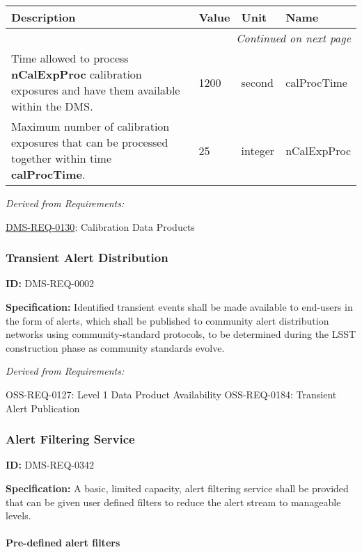 \documentclass[SE,toc,lsstdraft]{lsstdoc}
\makeatletter
\newcommand{\paramname}[1]{\hspace{0pt}#1}
\newcommand{\unitname}[1]{\hspace{0pt}#1}
\newenvironment{parameters}[0]{%
\setlength\LTleft{0pt}
\setlength\LTright{\fill}
\begin{small}
\begin{longtable}[]{|p{0.5\textwidth}|l|p{0.6in}|p{1.74in}@{}|}

\hline \textbf{Description} & \textbf{Value} & \textbf{Unit} & \textbf{Name} \\ \hline
\endhead

\hline \multicolumn{4}{r}{\emph{Continued on next page}} \\
\endfoot

\hline\hline
\endlastfoot
}{%
\hline
\end{longtable}
\end{small}
}
\makeatother
\begin{document}
\begin{parameters}
Time allowed to process \textbf{nCalExpProc} calibration exposures and have them available within the DMS.
&
1200
&
\unitname{%
second
}
&
\paramname{%
calProcTime
} \\\hline
Maximum number of calibration exposures that can be processed together within time \textbf{calProcTime}.
&
25
&
\unitname{%
integer
}
&
\paramname{%
nCalExpProc
} \\\hline
\end{parameters}




\emph{Derived from Requirements:}

\hyperref[DMS-REQ-0130]{DMS-REQ-0130}:
Calibration Data Products \newline


\subsubsection{Transient Alert Distribution}

\label{DMS-REQ-0002}
\textbf{ID:} DMS-REQ-0002

\textbf{Specification:} Identified transient events shall be made available to end-users in the form of alerts, which shall be published to community alert distribution networks using community-standard protocols, to be determined during the LSST construction phase as community standards evolve.






\emph{Derived from Requirements:}

OSS-REQ-0127:
Level 1 Data Product Availability \newline
OSS-REQ-0184:
Transient Alert Publication \newline


\subsubsection{Alert Filtering Service}

\label{DMS-REQ-0342}
\textbf{ID:} DMS-REQ-0342

\textbf{Specification:} A basic, limited capacity, alert filtering service shall be provided that can be given user defined filters to reduce the alert stream to manageable levels.







\paragraph{Pre-defined alert filters}\hfill  %
\end{document}
